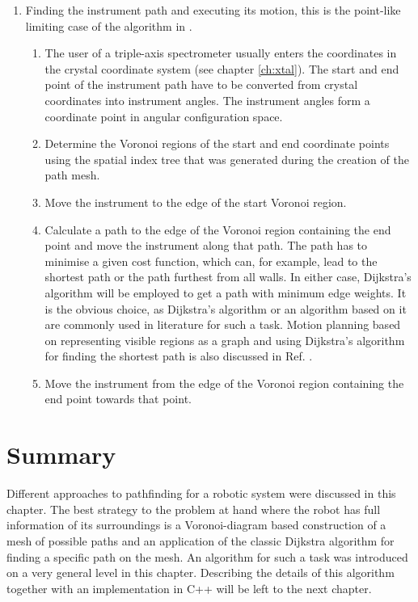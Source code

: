 \begin{enumerate}
	\item Finding the instrument path and executing its motion, this is the 
		point-like limiting case of the algorithm in \cite[p. 163]{Berg2008}.
	\begin{enumerate}
		\item The user of a triple-axis spectrometer usually enters the coordinates 
			in the crystal coordinate system (see chapter \ref{ch:xtal}). The start 
			and end point of the instrument path have to be converted from crystal
			coordinates into instrument angles. The instrument angles form a 
			coordinate point in angular configuration space.
		\item Determine the Voronoi regions of the start and end coordinate points
			using the spatial index tree that was generated during the creation
			of the path mesh.
		\item Move the instrument to the edge of the start Voronoi region.
		\item Calculate a path to the edge of the Voronoi region 
			containing the end point and move the instrument along that path. 
			The path has to minimise a given cost function, which can,
			for example, lead to the shortest path or the path furthest from
			all walls. 
			In either case, Dijkstra's algorithm \cite{wiki_dijkstra}
			will be employed to get a path with minimum edge weights.
			It is the obvious choice, as Dijkstra's algorithm or an algorithm based 
			on it are commonly used in literature \cite{Hwang2003, Singal2014} 
			for such a task. Motion planning based on representing visible regions
			as a graph and using Dijkstra's algorithm for finding the shortest path
			is also discussed in Ref. \cite[Ch. 7, p. 313]{FUH_geo2020}.
		\item Move the instrument from the edge of the Voronoi region containing 
			the end point towards that point.
	\end{enumerate}
\end{enumerate}


\section{Summary}
Different approaches to pathfinding for a robotic system were discussed in this chapter.
The best strategy to the problem at hand where the robot has full information of its
surroundings is a Voronoi-diagram based construction of a mesh of possible paths and 
an application of the classic Dijkstra algorithm for finding a specific path on the mesh.
An algorithm for such a task was introduced on a very general level in this chapter.
Describing the details of this algorithm together with an implementation in C++  
will be left to the next chapter.
